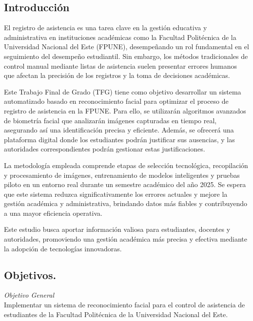 \documentclass[10pt,a4paper]{article}
\begin{document}
\vspace{.5cm}
\begin{multicols}{2}
\thispagestyle{empty}
\section{Introducción}

El registro de asistencia es una tarea clave en la gestión educativa y administrativa en instituciones académicas como la Facultad Politécnica de la Universidad Nacional del Este (FPUNE), desempeñando un rol fundamental en el seguimiento del desempeño estudiantil. Sin embargo, los métodos tradicionales de control manual mediante listas de asistencia suelen presentar errores humanos que afectan la precisión de los registros y la toma de decisiones académicas.

Este Trabajo Final de Grado (TFG) tiene como objetivo desarrollar un sistema automatizado basado en reconocimiento facial para optimizar el proceso de registro de asistencia en la FPUNE. Para ello, se utilizarán algoritmos avanzados de biometría facial que analizarán imágenes capturadas en tiempo real, asegurando así una identificación precisa y eficiente. Además, se ofrecerá una plataforma digital donde los estudiantes podrán justificar sus ausencias, y las autoridades correspondientes podrán gestionar estas justificaciones.

La metodología empleada comprende etapas de selección tecnológica, recopilación y procesamiento de imágenes, entrenamiento de modelos inteligentes y pruebas piloto en un entorno real durante un semestre académico del año 2025. Se espera que este sistema reduzca significativamente los errores actuales y mejore la gestión académica y administrativa, brindando datos más fiables y contribuyendo a una mayor eficiencia operativa.

Este estudio busca aportar información valiosa para estudiantes, docentes y autoridades, promoviendo una gestión académica más precisa y efectiva mediante la adopción de tecnologías innovadoras.
\subsection{Objetivos.}
\vspace{0.5cm}
\textit{Objetivo General}\\
Implementar un sistema de reconocimiento facial para el control de asistencia de estudiantes de la Facultad Politécnica de la Universidad Nacional del Este.


\end{multicols}
\end{document}

